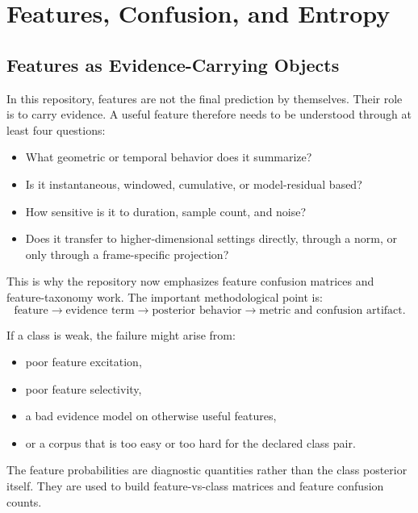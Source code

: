 \documentclass[11pt]{article}
\begin{document}
\section{Features, Confusion, and Entropy}

\subsection{Features as Evidence-Carrying Objects}

In this repository, features are not the final prediction by themselves. Their
role is to carry evidence. A useful feature therefore needs to be understood
through at least four questions:
\begin{itemize}[leftmargin=1.5em]
    \item What geometric or temporal behavior does it summarize?
    \item Is it instantaneous, windowed, cumulative, or model-residual based?
    \item How sensitive is it to duration, sample count, and noise?
    \item Does it transfer to higher-dimensional settings directly, through a
    norm, or only through a frame-specific projection?
\end{itemize}

This is why the repository now emphasizes feature confusion matrices and
feature-taxonomy work. The important methodological point is:
\begin{equation}
    \text{feature} \longrightarrow \text{evidence term}
    \longrightarrow \text{posterior behavior}
    \longrightarrow \text{metric and confusion artifact}.
\end{equation}

If a class is weak, the failure might arise from:
\begin{itemize}[leftmargin=1.5em]
    \item poor feature excitation,
    \item poor feature selectivity,
    \item a bad evidence model on otherwise useful features,
    \item or a corpus that is too easy or too hard for the declared class pair.
\end{itemize}

The feature probabilities are diagnostic quantities rather than the class
posterior itself. They are used to build feature-vs-class matrices and feature
confusion counts.
\end{document}
